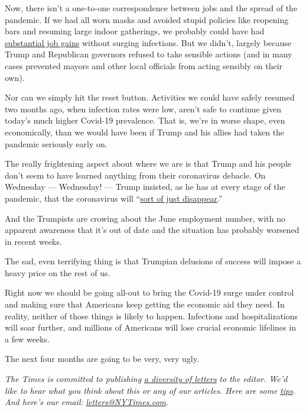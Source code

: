 Now, there isn't a one-to-one correspondence between jobs and the spread
of the pandemic. If we had all worn masks and avoided stupid policies
like reopening bars and resuming large indoor gatherings, we probably
could have had \href{https://www.nber.org/papers/w27244}{substantial job
gains} without surging infections. But we didn't, largely because Trump
and Republican governors refused to take sensible actions (and in many
cases prevented mayors and other local officials from acting sensibly on
their own).

Nor can we simply hit the reset button. Activities we could have safely
resumed two months ago, when infection rates were low, aren't safe to
continue given today's much higher Covid-19 prevalence. That is, we're
in worse shape, even economically, than we would have been if Trump and
his allies had taken the pandemic seriously early on.

The really frightening aspect about where we are is that Trump and his
people don't seem to have learned anything from their coronavirus
debacle. On Wednesday --- Wednesday! --- Trump insisted, as he has at
every stage of the pandemic, that the coronavirus will
``\href{https://www.cnn.com/2020/07/01/politics/donald-trump-masks-coronavirus/index.html}{sort
of just disappear}.''

And the Trumpists are crowing about the June employment number, with no
apparent awareness that it's out of date and the situation has probably
worsened in recent weeks.

The sad, even terrifying thing is that Trumpian delusions of success
will impose a heavy price on the rest of us.

Right now we should be going all-out to bring the Covid-19 surge under
control and making sure that Americans keep getting the economic aid
they need. In reality, neither of those things is likely to happen.
Infections and hospitalizations will soar further, and millions of
Americans will lose crucial economic lifelines in a few weeks.

The next four months are going to be very, very ugly.

\emph{The Times is committed to publishing}
\href{https://www.nytimes3xbfgragh.onion/2019/01/31/opinion/letters/letters-to-editor-new-york-times-women.html}{\emph{a
diversity of letters}} \emph{to the editor. We'd like to hear what you
think about this or any of our articles. Here are some}
\href{https://help.nytimes3xbfgragh.onion/hc/en-us/articles/115014925288-How-to-submit-a-letter-to-the-editor}{\emph{tips}}\emph{.
And here's our email:}
\href{mailto:letters@NYTimes.com}{\emph{letters@NYTimes.com}}\emph{.}

